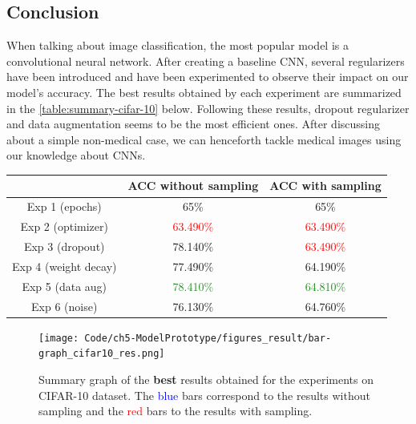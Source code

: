 \documentclass[11pt, openany]{report}
\theoremstyle{plain}
\theoremstyle{definition}
\theoremstyle{remark}
\begin{document}
\subsection{Conclusion}
When talking about image classification, the most popular model is a convolutional neural network. After creating a baseline CNN, several regularizers have been introduced and have been experimented to observe their impact on our model's accuracy. The best results obtained by each experiment are summarized in the \autoref{table:summary-cifar-10} below. Following these results, dropout regularizer and data augmentation seems to be the most efficient ones. After discussing about a simple non-medical case, we can henceforth tackle medical images using our knowledge about CNNs. 

\begin{center}

\begin{tabular}{|c|c|c|}
  \hline
          & \textbf{ACC without sampling} & \textbf{ACC with sampling} \\
  \hline
  Exp 1 (epochs) & 65\% & 65\% \\
  \hline
  Exp 2 (optimizer) & \textcolor{red}{63.490\%} & \textcolor{red}{63.490\%}  \\ 
  \hline
  Exp 3 (dropout) & 78.140\% & \textcolor{red}{63.490\%} \\
  \hline
  Exp 4 (weight decay) & 77.490\% & 64.190\%  \\ 
  \hline 
  Exp 5 (data aug) & \textcolor{ForestGreen}{78.410\%} & \textcolor{ForestGreen}{64.810\%} \\
  \hline
  Exp 6 (noise) & 76.130\% & 64.760\% \\
  \hline
\end{tabular}
\label{table:summary-cifar-10}

\begin{figure}[H]
  \centering
  \texttt{[image: Code/ch5-ModelPrototype/figures\_result/bar-graph\_cifar10\_res.png]}
    \caption{Summary graph of the \textbf{best} results obtained for the experiments on CIFAR-10 dataset. The \textcolor{blue}{blue} bars correspond to the results without sampling and the \textcolor{red}{red} bars to the results with sampling.}
  \label{fig:bar-graph_cifar10_res}
\end{figure}

\end{center}
\end{document}
